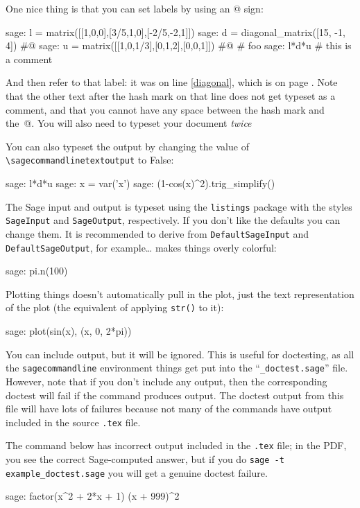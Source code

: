 \documentclass{article}
\begin{document}
One nice thing is that you can set labels by using an @ sign:

\begin{sagecommandline}
  sage: l = matrix([[1,0,0],[3/5,1,0],[-2/5,-2,1]])
  sage: d = diagonal_matrix([15, -1, 4]) #@\label{diagonal}
  sage: u = matrix([[1,0,1/3],[0,1,2],[0,0,1]]) #@\label{anotherlabel} \# foo
  sage: l*d*u   # this is a comment
\end{sagecommandline}

And then refer to that label: it was on line \ref{diagonal}, which is on
page \pageref{diagonal}. Note that the other text after the hash mark on
that line does not get typeset as a comment, and that you cannot have
any space between the hash mark and the~@. You will also need to typeset
your document \emph{twice}

You can also typeset the output by changing the value of
\verb|\sagecommandlinetextoutput| to False:
\renewcommand{\sagecommandlinetextoutput}{False}
\begin{sagecommandline}
  sage: l*d*u
  sage: x = var('x')
  sage: (1-cos(x)^2).trig_simplify()
\end{sagecommandline}

\renewcommand{\sagecommandlinetextoutput}{True}

The Sage input and output is typeset using the \texttt{listings} package
with the styles \texttt{SageInput} and \texttt{SageOutput},
respectively. If you don't like the defaults you can change them. It is
recommended to derive from \texttt{DefaultSageInput} and
\texttt{DefaultSageOutput}, for example\ldots
{}
makes things overly colorful:
\begin{sagecommandline}
  sage: pi.n(100)
\end{sagecommandline}

Plotting things doesn't automatically pull in the plot, just the text
representation of the plot (the equivalent of applying \texttt{str()} to
it):

\begin{sagecommandline}
  sage: plot(sin(x), (x, 0, 2*pi))
\end{sagecommandline}

You can include output, but it will be ignored. This is useful for
doctesting, as all the \texttt{sagecommandline} environment things get
put into the ``\texttt{\_doctest.sage}'' file. However, note that if you
don't include any output, then the corresponding doctest will fail if
the command produces output. The doctest output from this file will have
lots of failures because not many of the commands have output included
in the source \texttt{.tex} file.

The command below has incorrect output included in the \texttt{.tex}
file; in the PDF, you see the correct Sage-computed answer, but if you
do \texttt{sage -t example\_doctest.sage} you will get a genuine doctest
failure.
\begin{sagecommandline}
  sage: factor(x^2 + 2*x + 1)
  (x + 999)^2
\end{sagecommandline}
\end{document}
